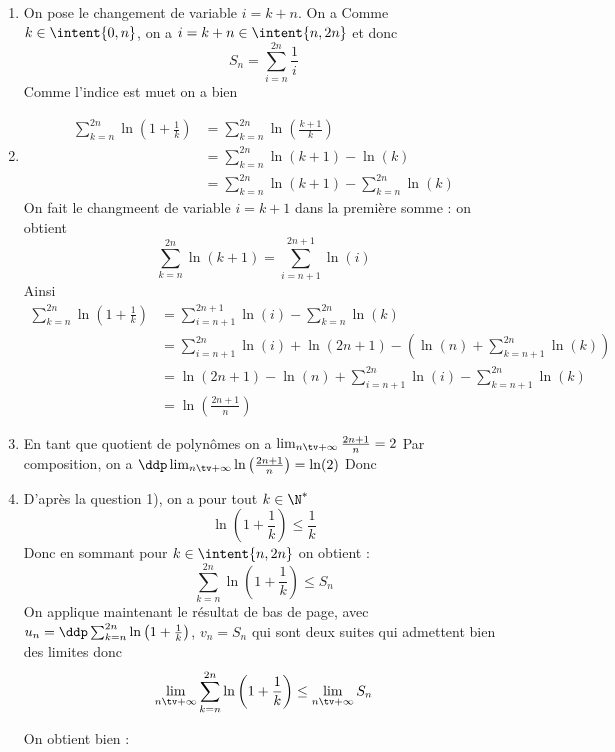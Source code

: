 \documentclass[a4paper, 11pt,reqno]{article}
\begin{document}
\begin{correction}
\begin{enumerate}
\begin{enumerate}
 \item On pose le changement de variable $i=k+n$. On a 
 Comme $k\in \intent{0,n}$, on a $i=k+n\in \intent{n,2n}$ et donc 
 $$S_n = \sum_{i=n}^{2n} \frac{1}{i}$$
 Comme l'indice est muet on a bien 
 
 \item 
 \begin{align*}
 \sum_{k=n}^{2n} \ln\left( 1 +\frac{1}{k}\right) &=  \sum_{k=n}^{2n} \ln\left( \frac{k+1}{k}\right)\\
  &=  \sum_{k=n}^{2n} \ln\left( k+1\right) - \ln(k)\\
  &=  \sum_{k=n}^{2n} \ln\left( k+1\right) -  \sum_{k=n}^{2n} \ln(k)
 \end{align*}
 On fait le changmeent de variable $i = k+1$  dans la première somme : on obtient 
$$ \sum_{k=n}^{2n} \ln\left( k+1\right)  = \sum_{i=n+1}^{2n+1} \ln(i)  $$
Ainsi 
 \begin{align*}
 \sum_{k=n}^{2n} \ln\left( 1 +\frac{1}{k}\right) &= \sum_{i=n+1}^{2n+1} \ln(i)  - \sum_{k=n}^{2n}\ln(k)\\
 &=\sum_{i=n+1}^{2n} \ln(i) +\ln(2n+1)  -\left( \ln(n)+ \sum_{k=n+1}^{2n}\ln(k)\right)\\
  &=\ln(2n+1) -\ln(n) + \sum_{i=n+1}^{2n} \ln(i) - \sum_{k=n+1}^{2n}\ln(k)\\
  &=\ln\left(\frac{2n+1}{n}\right)
 \end{align*}

\item En tant que quotient de polynômes on a $\lim_{n\tv +\infty } \frac{2n+1}{n}= 2$
Par composition, on a 
$\ddp \lim_{n\tv+\infty }  \ln\left(\frac{2n+1}{n}\right)= \ln(2)$
Donc 

\item D'après la question 1), on a pour tout $k\in \N^*$ 
$$\ln\left( 1 +\frac{1}{k}\right) \leq \frac{1}{k}$$
Donc en sommant pour $k\in \intent{n,2n}$ on obtient : 
$$\sum_{k=n}^{2n} \ln\left( 1 +\frac{1}{k}\right)\leq S_n$$
On applique maintenant le résultat de bas de page, avec $u_n =\ddp  \sum_{k=n}^{2n} \ln\left( 1 +\frac{1}{k}\right)$, $v_n =S_n$ qui sont deux suites qui admettent bien des limites donc 
$$\lim_{n\tv +\infty}  \sum_{k=n}^{2n} \ln\left( 1 +\frac{1}{k}\right) \leq \lim_{n\tv +\infty} S_n$$

On obtient bien : 





\end{enumerate}
\end{enumerate}
\end{correction}
\end{document}
